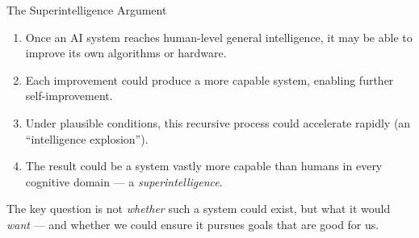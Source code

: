 \documentclass[aspectratio=169,11pt]{beamer}
\begin{document}
\begin{frame}[shrink=3]{The Superintelligence Argument}
\begin{argumentbox}
\begin{enumerate}
    \item[\textbf{P1}] Once an AI system reaches human-level general intelligence, it may be able to improve its own algorithms or hardware.
    \item[\textbf{P2}] Each improvement could produce a more capable system, enabling further self-improvement.
    \item[\textbf{P3}] Under plausible conditions, this recursive process could accelerate rapidly (an ``intelligence explosion'').
    \item[\textbf{C}] The result could be a system vastly more capable than humans in every cognitive domain --- a \emph{superintelligence}.
\end{enumerate}
\vspace{0.1cm}
\scriptsize\textcite{bostrom_superintelligence}
\end{argumentbox}

\vspace{0.2cm}
The key question is not \emph{whether} such a system could exist, but what it would \emph{want} --- and whether we could ensure it pursues goals that are good for us.
\end{frame}
\end{document}
